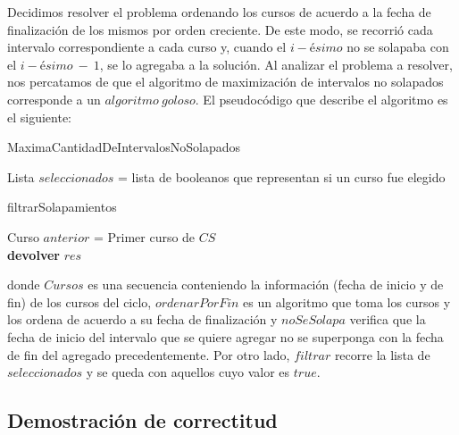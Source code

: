 Decidimos resolver el problema ordenando los cursos de acuerdo a la fecha de finalización de los mismos por orden creciente. De este modo, se recorrió cada intervalo correspondiente a cada curso y, cuando el $i-ésimo$ no se solapaba con el $i-ésimo\ -\ 1$, se lo agregaba a la solución.\newline
Al analizar el problema a resolver, nos percatamos de que el algoritmo de maximización de intervalos no solapados corresponde a un $algoritmo\ goloso$. El pseudocódigo que describe el algoritmo es el siguiente:\newline

\begin{algorithm}[H]
    \SetAlgoLined
    \caption{MaximaCantidadDeIntervalosNoSolapados}
    Lista $seleccionados$ = lista de booleanos que representan si un curso fue elegido
\end{algorithm}

\begin{algorithm}[H]
    \SetAlgoLined
    \caption{filtrarSolapamientos}
    Curso $anterior$ = Primer curso de $CS$\\
    \textbf{devolver} $res$\\   
\end{algorithm}


donde $Cursos$ es una secuencia conteniendo la información (fecha de inicio y de fin) de los cursos del ciclo, $ordenarPorFin$ es un algoritmo que toma los cursos y los ordena de acuerdo a su fecha de finalización y $noSeSolapa$ verifica que la fecha de inicio del intervalo que se quiere agregar no se superponga con la fecha de fin del agregado precedentemente. Por otro lado, $filtrar$ recorre la lista de $seleccionados$ y se queda con aquellos cuyo valor es $true$.

\subsection{Demostración de correctitud}

